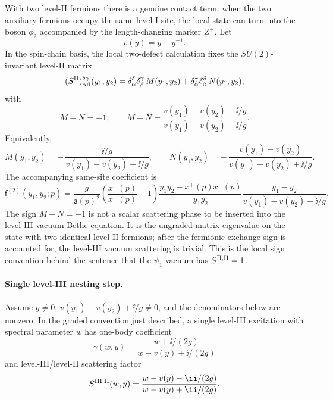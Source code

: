 With two level-II fermions there is a genuine contact term: when the two
auxiliary fermions occupy the same level-I site, the local state can turn
into the boson \(\phi_2\) accompanied by the length-changing marker \(Z^+\).
Let
\[
  v(y)=y+y^{-1}.
\]
In the spin-chain basis, the local two-defect calculation fixes the
\(SU(2)\)-invariant level-II matrix
\begin{equation}
  (S^{{\rm II}})_{\alpha\beta}^{\delta\gamma}(y_1,y_2)
  =
  \delta_\alpha^\delta\delta_\beta^\gamma\,M(y_1,y_2)
  +
  \delta_\alpha^\gamma\delta_\beta^\delta\,N(y_1,y_2),
  \label{eq:planar-n4-level-ii-mn-definition}
\end{equation}
with
\begin{equation}
  M+N=-1,
  \qquad
  M-N=
  \frac{v(y_1)-v(y_2)-\ii/g}{v(y_1)-v(y_2)+\ii/g}.
  \label{eq:planar-n4-level-ii-mn-eigenvalues}
\end{equation}
Equivalently,
\[
  M(y_1,y_2)=
  -\,\frac{\ii/g}{v(y_1)-v(y_2)+\ii/g},
  \qquad
  N(y_1,y_2)=
  -\,\frac{v(y_1)-v(y_2)}{v(y_1)-v(y_2)+\ii/g}.
\]
The accompanying same-site coefficient is
\begin{equation}
  \mathsf f^{(2)}(y_1,y_2;p)
  =
  \frac{g}{\mathsf a(p)^2}
  \left(\frac{x^-(p)}{x^+(p)}-1\right)
  \frac{y_1y_2-x^+(p)x^-(p)}{y_1y_2}
  \frac{y_1-y_2}{v(y_1)-v(y_2)+\ii/g}.
  \label{eq:planar-n4-level-ii-contact-coefficient}
\end{equation}
The sign \(M+N=-1\) is not a scalar scattering phase to be inserted into
the level-III vacuum Bethe equation.  It is the ungraded matrix eigenvalue
on the state with two identical level-II fermions; after the fermionic
exchange sign is accounted for, the level-III vacuum scattering is trivial.
This is the local sign convention behind the sentence that the
\(\psi_1\)-vacuum has \(S^{{\rm II},{\rm II}}=1\).

\paragraph{Single level-III nesting step.}
\label{par:planar-n4-single-level-iii-nesting-step}
Assume \(g\neq0\), \(v(y_1)-v(y_2)+\ii/g\neq0\), and the denominators below
are nonzero.  In the graded convention just described, a single level-III
excitation with spectral parameter \(w\) has one-body coefficient
\[
  \gamma(w,y)=
  \frac{w+\ii/(2g)}{w-v(y)+\ii/(2g)}
\]
and level-III/level-II scattering factor
\begin{equation}
  S^{{\rm III},{\rm II}}(w,y)
  =
  \frac{w-v(y)-\ii/(2g)}
       {w-v(y)+\ii/(2g)}.
  \label{eq:planar-n4-level-iii-level-ii-factor}
\end{equation}

